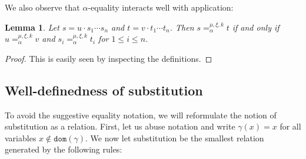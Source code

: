 \documentclass{lmcs}
\theoremstyle{theorem}\newtheorem{theorem}{Theorem}
\theoremstyle{theorem}\newtheorem{lemma}[theorem]{Lemma}
\theoremstyle{theorem}\newtheorem{corollary}[theorem]{Corollary}
\theoremstyle{definition}\newtheorem{definition}[theorem]{Definition}
\theoremstyle{definition}\newtheorem{example}[theorem]{Example}
\newcommand{\domain}{\mathtt{dom}}
\begin{document}
We also observe that $\alpha$-equality interacts well with application:

\begin{lemma}\label{lem:alphaappl}
Let $s = u \cdot s_1 \cdots s_n$ and $t = v \cdot t_1 \cdots t_n$.
Then $s =_\alpha^{\mu,\xi,k} t$ if and only if $u =_\alpha^{\mu,\xi,k} v$ and
$s_i =_\alpha^{\mu,\xi,k} t_i$ for $1 \leq i \leq n$.
\end{lemma}

\begin{proof}
This is easily seen by inspecting the definitions.
\end{proof}

\subsection{Well-definedness of substitution}

\newcommand{\subrel}[1]{\mathsf{subst}(#1)}

To avoid the suggestive equality notation, we will reformulate the notion of
substitution as a relation.  First, let us abuse notation and write
$\gamma(x) = x$ for all variables $x \notin \domain(\gamma)$.  We now let
substitution be the smallest relation generated by the following rules:
\end{document}
